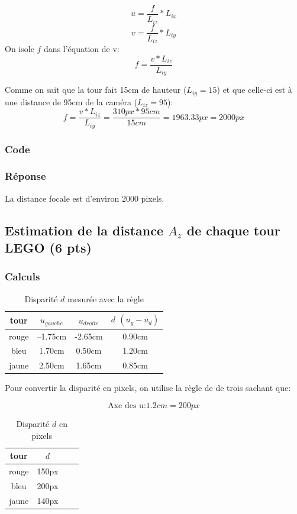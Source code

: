 \documentclass[12pt]{article}
\begin{document}
\[
    u =  \frac{f}{L_{iz}} * L_{ix}
\]
\[
    v =  \frac{f}{L_{iz}} * L_{iy}
\]
On isole $f$ dans l'\'equation de v:
\[
    f =  \frac{v * L_{iz}}{L_{iy}}
\]

Comme on sait que la tour fait 15cm de hauteur ($L_{iy} = 15$) et que celle-ci est \`a une distance de 95cm de la cam\'era ($L_{iz} = 95$):
\[
    f =  \frac{v * L_{iz}}{L_{iy}} = \frac{310px * 95 cm}{15cm} = 1963.33 px = 2000 px
\]


\subsubsection{Code}
\subsubsection{Réponse}
La distance focale est d'environ 2000 pixels.

\subsection{Estimation de la distance $A_z$ de chaque tour LEGO (6 pts)}
\label{estimation_distance_Az}
\subsubsection{Calculs}

\begin{table}[h]
\caption{Disparit\'e $d$ mesur\'ee avec la r\`egle}
\label{TableCoord}
\begin{center}
\begin{tabular}{|c|c|c|c|}
\hline
    tour   &  $u_{gauche}$  &  $u_{droite}$  &  $d$ $(u_g - u_d)$ \\
\hline
    rouge  & --1.75cm & -2.65cm & 0.90cm \\
    bleu   & 1.70cm & 0.50cm & 1.20cm \\
    jaune  & 2.50cm & 1.65cm & 0.85cm \\
\hline
\end{tabular}
\end{center}
\end{table}

Pour convertir la disparit\'e en pixels, on utilise la r\`egle de de trois sachant que:

\[ \text{Axe des u:} 1.2cm = 200px \]


\begin{table}[h]
\caption{Disparit\'e $d$ en pixels}
\label{TableCoord}
\begin{center}
\begin{tabular}{|c|c|c|c|}
\hline
    tour   &  $d$ \\
\hline
    rouge  &  150px \\
    bleu   &  200px \\
    jaune  &  140px \\
\hline
\end{tabular}
\end{center}
\end{table}
\end{document}
